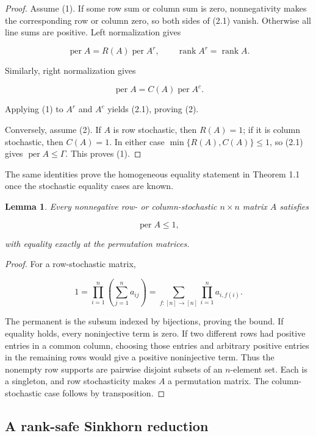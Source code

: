 \documentclass[11pt]{article}
\newtheorem{lemma}[theorem]{Lemma}
\theoremstyle{remark}
\begin{document}
\begin{proof}
Assume (1). If some row sum or column sum is zero, nonnegativity
makes the corresponding row or column zero, so both sides of (2.1) vanish.
Otherwise all line sums are positive. Left normalization gives

\[
 \operatorname{per}A=R(A)\operatorname{per}A^r,
 \qquad
 \operatorname{rank}A^r=\operatorname{rank}A.              \tag{2.2}
\]

Similarly, right normalization gives

\[
 \operatorname{per}A=C(A)\operatorname{per}A^c.            \tag{2.3}
\]

Applying (1) to \(A^r\) and \(A^c\) yields (2.1), proving (2).

Conversely, assume (2). If \(A\) is row stochastic, then \(R(A)=1\); if it
is column stochastic, then \(C(A)=1\). In either case
\(\min\{R(A),C(A)\}\leq1\), so (2.1) gives
\(\operatorname{per}A\leq\Gamma\). This proves (1).
\end{proof}

The same identities prove the homogeneous equality statement in Theorem
1.1 once the stochastic equality cases are known.

\begin{lemma}
Every nonnegative row- or
column-stochastic \(n\times n\) matrix \(A\) satisfies

\[
 \operatorname{per}A\leq1,                                 \tag{2.4}
\]

with equality exactly at the permutation matrices.
\end{lemma}

\begin{proof}
For a row-stochastic matrix,

\[
 1=\prod_{i=1}^n\left(\sum_{j=1}^n a_{ij}\right)
 =\sum_{f:[n]\to[n]}\prod_{i=1}^n a_{i,f(i)}.              \tag{2.5}
\]

The permanent is the subsum indexed by bijections, proving the bound. If
equality holds, every noninjective term is zero. If two different rows had
positive entries in a common column, choosing those entries and arbitrary
positive entries in the remaining rows would give a positive noninjective
term. Thus the nonempty row supports are pairwise disjoint subsets of an
\(n\)-element set. Each is a singleton, and row stochasticity makes \(A\) a
permutation matrix. The column-stochastic case follows by transposition.
\end{proof}

\subsection{A rank-safe Sinkhorn reduction}
\end{document}
